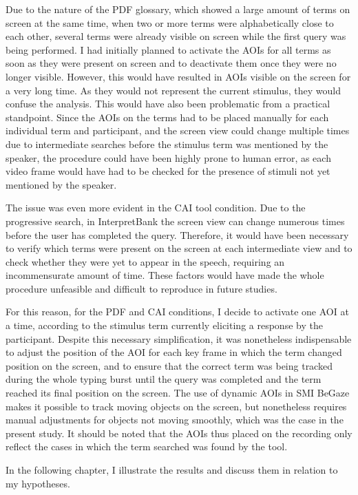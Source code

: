 Due to the nature of the PDF glossary, which showed a large amount of terms on screen at the same time, when two or more terms were alphabetically close to each other, several terms were already visible on screen while the first query was being performed. I had initially planned to activate the AOIs for all terms as soon as they were present on screen and to deactivate them once they were no longer visible. However, this would have resulted in AOIs visible on the screen for a very long time. As they would not represent the current stimulus, they would confuse the analysis. This would have also been problematic from a practical standpoint. Since the AOIs on the terms had to be placed manually for each individual term and participant, and the screen view could change multiple times due to intermediate searches before the stimulus term was mentioned by the speaker, the procedure could have been highly prone to human error, as each video frame would have had to be checked for the presence of stimuli not yet mentioned by the speaker.

The issue was even more evident in the CAI tool condition. Due to the progressive search, in InterpretBank the screen view can change numerous times before the user has completed the query. Therefore, it would have been necessary to verify which terms were present on the screen at each intermediate view and to check whether they were yet to appear in the speech, requiring an incommensurate amount of time. These factors would have made the whole procedure unfeasible and difficult to reproduce in future studies.

For this reason, for the PDF and CAI conditions, I decide to activate one AOI at a time, according to the stimulus term currently eliciting a response by the participant. Despite this necessary simplification, it was nonetheless indispensable to adjust the position of the AOI for each key frame in which the term changed position on the screen, and to ensure that the correct term was being tracked during the whole typing burst until the query was completed and the term reached its final position on the screen. The use of dynamic AOIs in SMI BeGaze makes it possible to track moving objects on the screen, but nonetheless requires manual adjustments for objects not moving smoothly, which was the case in the present study. It should be noted that the AOIs thus placed on the recording only reflect the cases in which the term searched was found by the tool.

In the following chapter, I illustrate the results and discuss them in relation to my hypotheses.
